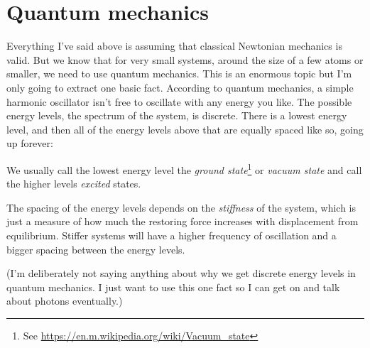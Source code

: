 \documentclass[a4paper]{article}
\begin{document}
\section{Quantum mechanics}

Everything I've said above is assuming that classical Newtonian mechanics is valid.
But we know that for very small systems, around the size of a few atoms or smaller, we need to use quantum mechanics.
This is an enormous topic but I'm only going to extract one basic fact.
According to quantum mechanics, a simple harmonic oscillator isn't free to oscillate with any energy you like.
The possible energy levels, the spectrum of the system, is discrete.
There is a lowest energy level, and then all of the energy levels above that are equally spaced like so, going up forever:

\begin{center}
\end{center}

We usually call the lowest energy level the {\em ground state}\footnote{See \url{https://en.m.wikipedia.org/wiki/Vacuum_state}} or {\em vacuum state} and call the higher levels {\em excited} states.

The spacing of the energy levels depends on the {\em stiffness} of the system, which is just a measure of how much the restoring force increases with displacement from equilibrium. Stiffer systems will have a higher frequency of oscillation and a bigger spacing between the energy levels.

(I'm deliberately not saying anything about why we get discrete energy levels in quantum mechanics. I just want to use this one fact so I can get on and talk about photons eventually.)
\end{document}
